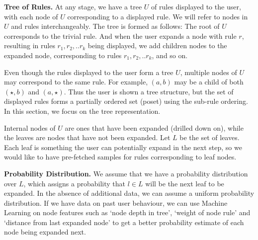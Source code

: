 \documentclass[10pt,journal,compsoc]{IEEEtran}
\newcounter{prob}
\newcommand{\stitle}[1]{\vspace{0.5em}\noindent\textbf{#1}}
\begin{document}
{\stitle{Tree of Rules.}
At any stage, we have a tree $U$ of rules displayed to the user, 
with each node of $U$ corresponding to a displayed rule. 
We will refer to nodes in $U$ and rules interchangeably.
The tree is formed as follows: The root of $U$ corresponds to the trivial rule. 
And when the user expands a node with rule $r$, resulting in rules $r_1, r_2, .. r_k$ being displayed, we add children nodes to the expanded node, corresponding to rules $r_1, r_2, .. r_k$, and so on.

Even though the rules displayed to the user form a tree $U$, 
multiple nodes of $U$ may correspond to the same rule. 
For example, $(a, b)$ may be a child of both $(\star, b)$ and $(a, \star)$.
Thus the user is shown a tree structure, but
the set of displayed rules forms a partially ordered set (poset) using the sub-rule ordering. In this section, we focus on the tree representation.

Internal nodes of $U$ are ones that have been expanded (drilled down on), 
while the leaves are nodes that have not been expanded. 
Let $L$ be the set of leaves. 
Each leaf is something the user can potentially expand in the next step, so we would like to have pre-fetched samples for rules corresponding to leaf nodes.

\stitle{Probability Distribution.} 
We assume that we have a probability distribution over $L$, which assigns a probability that $l \in L$ will be the next leaf to be expanded. In the absence of additional data, we can assume a uniform probability distribution. If we have data on past user behaviour, we can use Machine Learning on node features such as `node depth in tree', `weight of node rule' and `distance from last expanded node' to get a better probability estimate of each node being expanded next. 



}
\end{document}
